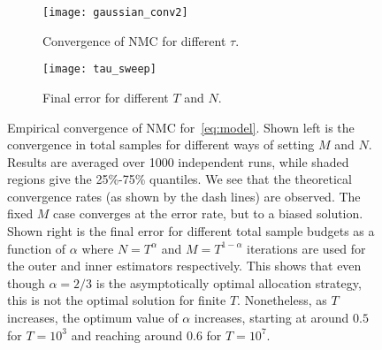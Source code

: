 \begin{figure}[t]
	\centering
	\begin{subfigure}[b]{0.49\textwidth}
		\centering
	\texttt{[image: gaussian\_conv2]}
	\caption{Convergence of NMC for different $\tau$. \label{fig:emprical-conv}}
	\end{subfigure}
	\begin{subfigure}[b]{0.49\textwidth}
		\centering
	\texttt{[image: tau\_sweep]}
		\caption{Final error for different $T$ and $N$.\label{fig:tau_sweep}}
	\end{subfigure}
	\vspace{5pt}
	\caption{Empirical convergence of NMC for~\eqref{eq:model}.  Shown left is the
		convergence in total samples for different ways of setting $M$ and $N$.  
		Results are averaged over 1000 independent runs, while shaded regions give the 25\%-75\% quantiles. We
		see that the theoretical convergence rates (as shown by the dash lines) are observed. 
		The fixed $M$ case converges at the \mc error rate, but to a biased solution.
		Shown right is the final error for different total sample budgets
		as a function of $\alpha$ where $N=T^{\alpha}$ and $M=T^{1-\alpha}$ iterations are used for the outer
		and inner estimators respectively.  This shows that even though $\alpha=2/3$ is the
		asymptotically optimal allocation strategy, this is not the optimal solution for
		finite $T$. Nonetheless, as $T$ increases, the optimum value of $\alpha$ increases,
		starting at around $0.5$ for $T=10^3$ and reaching around $0.6$ for $T=10^7$. \vspace{-5pt}}
\end{figure}	

